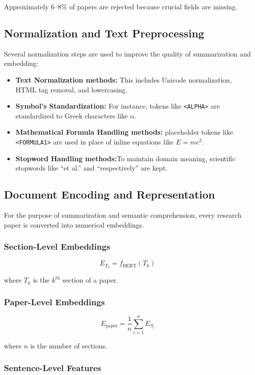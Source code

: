 \documentclass[conference]{IEEEtran}
\begin{document}
Approximately 6--8\% of papers are rejected because crucial fields are missing.

\subsection{Normalization and Text Preprocessing}

Several normalization steps are used to improve the quality of summarization and embedding:

\begin{itemize}
\item \textbf{Text Normalization methods:} This includes Unicode normalization, HTML tag removal, and lowercasing.
\item \textbf{Symbol's Standardization:} For instance, tokens like \texttt{<ALPHA>} are standardized to Greek characters like $\alpha$. 
\item \textbf{Mathematical Formula Handling methods:} placeholder tokens like \texttt{<FORMULA1>} are used in place of inline equations like  $E = mc^2$.
\item \textbf{Stopword Handling methods:}To maintain domain meaning, scientific stopwords like ``et al.'' and ``respectively'' are kept. 
\end{itemize}

\subsection{Document Encoding and Representation}

For the purpose of summarization and semantic comprehension, every research paper is converted into numerical embeddings.
\subsubsection{Section-Level Embeddings}

\[
E_{T_k} = f_{\text{BERT}}(T_k)
\]

where $T_k$ is the $k^{th}$ section of a paper.

\subsubsection{Paper-Level Embeddings}

\[
E_{\text{paper}} = \frac{1}{n} \sum_{i=1}^{n} E_{S_i}
\]

where $n$ is the number of sections.

\subsubsection{Sentence-Level Features}
\end{document}

